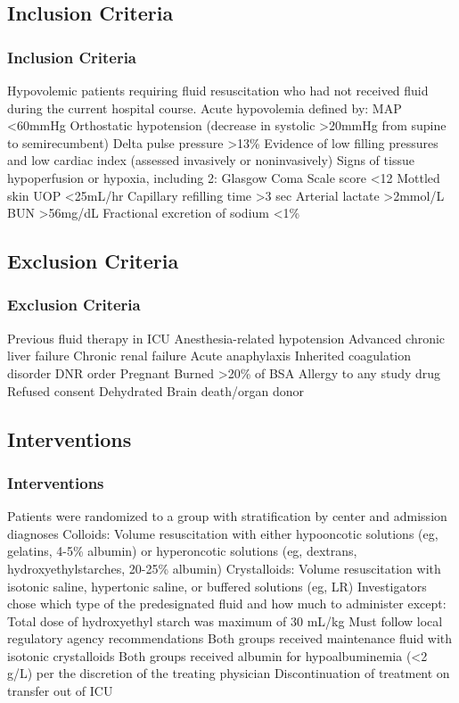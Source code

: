 \documentclass{beamer}
\begin{document}
\subsection{Inclusion Criteria}
\begin{frame}
	\frametitle{Inclusion Criteria}
Hypovolemic patients requiring fluid resuscitation who had not received fluid during the current hospital course.
Acute hypovolemia defined by:
MAP <60mmHg
Orthostatic hypotension (decrease in systolic >20mmHg from supine to semirecumbent)
Delta pulse pressure >13\%
Evidence of low filling pressures and low cardiac index (assessed invasively or noninvasively)
Signs of tissue hypoperfusion or hypoxia, including 2:
Glasgow Coma Scale score <12
Mottled skin
UOP <25mL/hr
Capillary refilling time >3 sec
Arterial lactate >2mmol/L
BUN >56mg/dL
Fractional excretion of sodium <1\%
\end{frame}
\subsection{Exclusion Criteria}
\begin{frame}
	\frametitle{Exclusion Criteria}
Previous fluid therapy in ICU
Anesthesia-related hypotension
Advanced chronic liver failure
Chronic renal failure
Acute anaphylaxis
Inherited coagulation disorder
DNR order
Pregnant
Burned >20\% of BSA
Allergy to any study drug
Refused consent
Dehydrated
Brain death/organ donor
	\end{frame}
\subsection{Interventions}
\begin{frame}
	\frametitle{Interventions}
Patients were randomized to a group with stratification by center and admission diagnoses
Colloids: Volume resuscitation with either hypooncotic solutions (eg, gelatins, 4-5\% albumin) or hyperoncotic solutions (eg, dextrans, hydroxyethylstarches, 20-25\% albumin)
Crystalloids: Volume resuscitation with isotonic saline, hypertonic saline, or buffered solutions (eg, LR)
Investigators chose which type of the predesignated fluid and how much to administer except:
Total dose of hydroxyethyl starch was maximum of 30 mL/kg
Must follow local regulatory agency recommendations
Both groups received maintenance fluid with isotonic crystalloids
Both groups received albumin for hypoalbuminemia (<2 g/L) per the discretion of the treating physician
Discontinuation of treatment on transfer out of ICU
\end{frame}
\end{document}
